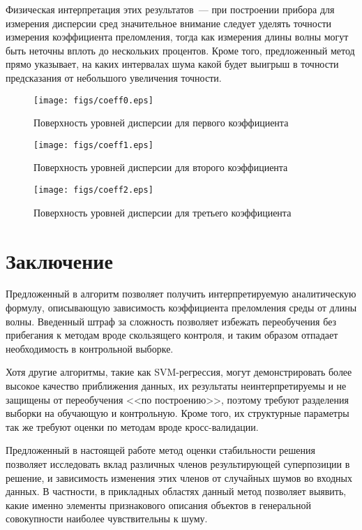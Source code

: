 \documentclass[12pt,a4paper]{article}
\begin{document}
Физическая интерпретация этих результатов~--- при построении прибора для измерения дисперсии
сред значительное внимание следует уделять точности измерения коэффициента преломления,
тогда как измерения длины волны могут быть неточны вплоть до нескольких процентов. Кроме того,
предложенный метод прямо указывает, на каких интервалах шума какой будет выигрыш в точности
предсказания от небольшого увеличения точности.

\begin{figure}[h]
  \centering
  \texttt{[image: figs/coeff0.eps]}
  \caption{Поверхность уровней дисперсии для первого коэффициента}
  \label{fig:coeff_0}
\end{figure}

\begin{figure}[h]
  \centering
  \texttt{[image: figs/coeff1.eps]}
  \caption{Поверхность уровней дисперсии для второго коэффициента}
  \label{fig:coeff_1}
\end{figure}

\begin{figure}[h]
  \centering
  \texttt{[image: figs/coeff2.eps]}
  \caption{Поверхность уровней дисперсии для третьего коэффициента}
  \label{fig:coeff_2}
\end{figure}

\FloatBarrier

\section{Заключение}

Предложенный в \cite{Rudoy13} алгоритм позволяет получить интерпретируемую аналитическую
формулу, описывающую зависимость коэффициента преломления среды от длины волны.
Введенный штраф за сложность позволяет избежать переобучения без прибегания к методам
вроде скользящего контроля, и таким образом отпадает необходимость в контрольной выборке.

Хотя другие алгоритмы, такие как SVM-регрессия, могут демонстрировать более высокое
качество приближения данных, их результаты неинтерпретируемы и не защищены от переобучения
<<по построению>>, поэтому требуют разделения выборки на обучающую и контрольную. Кроме
того, их структурные параметры так же требуют оценки по методам вроде кросс-валидации.

Предложенный в настоящей работе метод оценки стабильности решения позволяет исследовать вклад различных
членов результирующей суперпозиции в решение, и зависимость изменения этих членов от
случайных шумов во входных данных. В частности, в прикладных областях данный метод позволяет
выявить, какие именно элементы признакового описания объектов в генеральной совокупности
наиболее чувствительны к шуму.


%
%

\end{document}
